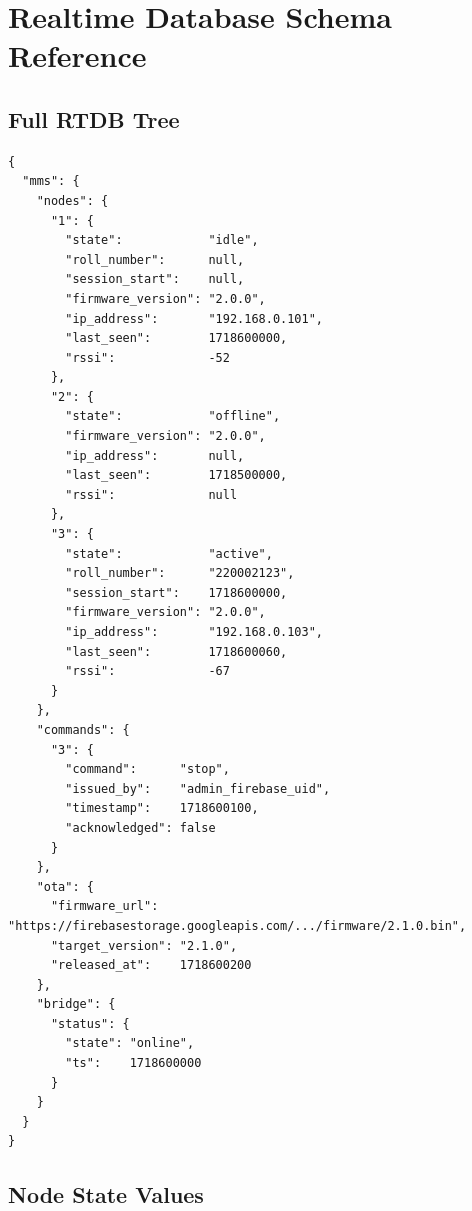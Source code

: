 \chapter{Realtime Database Schema Reference}
\label{app:rtdb_schema}

\section{Full RTDB Tree}

\begin{lstlisting}[style=jsonlstyle,caption={Complete RTDB Structure}]
{
  "mms": {
    "nodes": {
      "1": {
        "state":            "idle",
        "roll_number":      null,
        "session_start":    null,
        "firmware_version": "2.0.0",
        "ip_address":       "192.168.0.101",
        "last_seen":        1718600000,
        "rssi":             -52
      },
      "2": {
        "state":            "offline",
        "firmware_version": "2.0.0",
        "ip_address":       null,
        "last_seen":        1718500000,
        "rssi":             null
      },
      "3": {
        "state":            "active",
        "roll_number":      "220002123",
        "session_start":    1718600000,
        "firmware_version": "2.0.0",
        "ip_address":       "192.168.0.103",
        "last_seen":        1718600060,
        "rssi":             -67
      }
    },
    "commands": {
      "3": {
        "command":      "stop",
        "issued_by":    "admin_firebase_uid",
        "timestamp":    1718600100,
        "acknowledged": false
      }
    },
    "ota": {
      "firmware_url":   "https://firebasestorage.googleapis.com/.../firmware/2.1.0.bin",
      "target_version": "2.1.0",
      "released_at":    1718600200
    },
    "bridge": {
      "status": {
        "state": "online",
        "ts":    1718600000
      }
    }
  }
}
\end{lstlisting}

\section{Node State Values}

